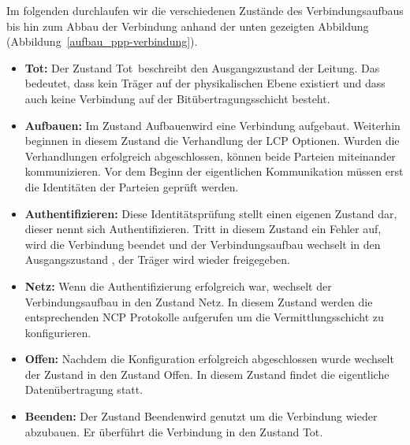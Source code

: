 \documentclass[12pt, a4paper, ngerman]{article}
\begin{document}
Im folgenden durchlaufen wir die verschiedenen Zustände des Verbindungsaufbaus bis hin zum Abbau der Verbindung anhand der unten gezeigten Abbildung (Abbildung~\ref{aufbau_ppp-verbindung}).

 
\begin{itemize}
\item{\textbf{Tot:}}
Der Zustand \glqq Tot\grqq ~beschreibt den Ausgangszustand der Leitung. Das bedeutet, dass kein Träger auf der physikalischen Ebene existiert und dass auch keine Verbindung auf der Bit\-über\-trag\-ungs\-schicht besteht. 

\item{\textbf{Aufbauen:}}
Im Zustand \glqq Aufbauen\grqq wird eine Verbindung aufgebaut. Weiterhin beginnen in diesem Zustand die Verhandlung der LCP Optionen. Wurden die Verhandlungen erfolgreich abgeschlossen, können beide Parteien miteinander kommunizieren. Vor dem Beginn der eigentlichen Kommunikation müssen erst die Identitäten der Parteien geprüft werden.

\item{\textbf{Authentifizieren:}}
Diese Identitätsprüfung stellt einen eigenen Zustand dar, dieser nennt sich \glqq Authentifizieren\grqq . Tritt in diesem Zustand ein Fehler auf, wird die Verbindung beendet und der Verbindungsaufbau wechselt  in den Ausgangszustand \grqq , der Träger wird wieder freigegeben.

\item{\textbf{Netz:}}
Wenn die Authentifizierung erfolgreich war, wechselt der Verbindungsaufbau in den Zustand \glqq Netz\grqq . In diesem Zustand werden die entsprechenden NCP Protokolle aufgerufen um die Vermittlungsschicht zu konfigurieren.

\item{\textbf{Offen:}}
Nachdem die Konfiguration erfolgreich abgeschlossen wurde wechselt der Zustand in den Zustand \glqq  Offen\grqq . In diesem Zustand findet die eigentliche Datenübertragung statt. 

\item{\textbf{Beenden:}}
Der Zustand \glqq Beenden\grqq wird genutzt um die Verbindung wieder abzubauen. Er überführt die Verbindung in den Zustand \glqq Tot\grqq .
\end{itemize}
\end{document}
